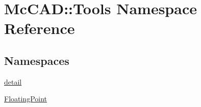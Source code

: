 \hypertarget{namespaceMcCAD_1_1Tools}{}\section{Mc\+C\+AD\+:\+:Tools Namespace Reference}
\label{namespaceMcCAD_1_1Tools}
\subsection*{Namespaces}
\begin{DoxyCompactItemize}
\item 
 \hyperlink{namespaceMcCAD_1_1Tools_1_1detail}{detail}
\item 
 \hyperlink{namespaceMcCAD_1_1Tools_1_1FloatingPoint}{Floating\+Point}
\end{DoxyCompactItemize}
